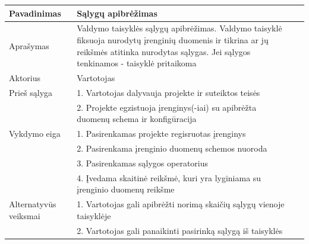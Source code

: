 \documentclass{VUMIFInfBakalaurinis}
\begin{document}
\hfill \break

%
%
\begin{tabular}{  l  p{10cm}  p{15cm} }

\toprule
\textbf{Pavadinimas}
& \textbf{Sąlygų apibrėžimas} \\
\midrule

Aprašymas
& Valdymo taisyklės sąlygų apibrėžimas. Valdymo taisyklė fiksuoja nurodytų įrenginių duomenis ir tikrina ar jų reikšmės atitinka nurodytas sąlygas. Jei sąlygos tenkinamos - taisyklė pritaikoma \\

\hline
Aktorius    
& Vartotojas \\

\hline
Prieš sąlyga
& 1. Vartotojas dalyvauja projekte ir suteiktos teisės \\
& 2. Projekte egzistuoja įrenginys(-iai) su apibrėžta duomenų schema ir konfigūracija \\

\hline
Vykdymo eiga    
& 1. Pasirenkamas projekte regisruotas įrenginys \\
& 2. Pasirenkama įrenginio duomenų schemos nuoroda \\
& 3. Pasirenkamas sąlygos operatorius \\
& 4. Įvedama skaitinė reikšmė, kuri yra lyginiama su įrenginio duomenų reikšme \\

\hline
Alternatyvūs veiksmai
& 1. Vartotojas gali apibrėžti norimą skaičių sąlygų vienoje taisyklėje \\
& 2. Vartotojas gali panaikinti pasirinką sąlygą iš taisyklės \\
\bottomrule
\end{tabular}

\hfill \break
\end{document}
